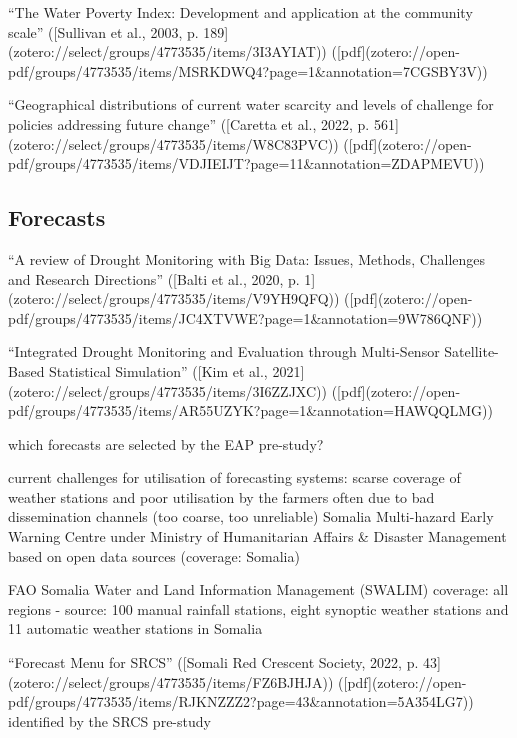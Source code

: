 {%
“The Water Poverty Index: Development and application at the community scale” ([Sullivan et al., 2003, p. 189](zotero://select/groups/4773535/items/3I3AYIAT)) ([pdf](zotero://open-pdf/groups/4773535/items/MSRKDWQ4?page=1&annotation=7CGSBY3V))

“Geographical distributions of current water scarcity and levels of challenge for policies addressing future change” ([Caretta et al., 2022, p. 561](zotero://select/groups/4773535/items/W8C83PVC)) ([pdf](zotero://open-pdf/groups/4773535/items/VDJIEIJT?page=11&annotation=ZDAPMEVU))


\subsection{Forecasts}

“A review of Drought Monitoring with Big Data: Issues, Methods, Challenges and Research Directions” ([Balti et al., 2020, p. 1](zotero://select/groups/4773535/items/V9YH9QFQ)) ([pdf](zotero://open-pdf/groups/4773535/items/JC4XTVWE?page=1&annotation=9W786QNF))

“Integrated Drought Monitoring and Evaluation through Multi-Sensor Satellite-Based Statistical Simulation” ([Kim et al., 2021](zotero://select/groups/4773535/items/3I6ZZJXC)) ([pdf](zotero://open-pdf/groups/4773535/items/AR55UZYK?page=1&annotation=HAWQQLMG))

which forecasts are selected by the EAP pre-study?

current challenges for utilisation of forecasting systems: scarse coverage of weather stations and poor utilisation by the farmers often due to bad dissemination channels  (too coarse, too unreliable)
Somalia Multi-hazard Early Warning Centre under Ministry of Humanitarian Affairs & Disaster Management
based on open data sources (coverage: Somalia)

FAO Somalia Water and Land Information Management (SWALIM) coverage: all regions - source: 100 manual rainfall stations, eight synoptic weather stations and 11 automatic weather stations in Somalia

“Forecast Menu for SRCS” ([Somali Red Crescent Society, 2022, p. 43](zotero://select/groups/4773535/items/FZ6BJHJA)) ([pdf](zotero://open-pdf/groups/4773535/items/RJKNZZZ2?page=43&annotation=5A354LG7))
identified by the SRCS pre-study

}
